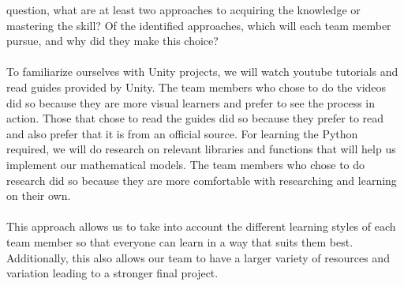 \documentclass[12pt]{article}
\begin{document}
\begin{enumerate}
  question, what are at least two approaches to acquiring the knowledge or
  mastering the skill?  Of the identified approaches, which will each team
  member pursue, and why did they make this choice?
  \\\\
  To familiarize ourselves with Unity projects, we will watch youtube tutorials and read guides provided by Unity.
  The team members who chose to do the videos did so because they are more visual learners and prefer to see the process in action.
  Those that chose to read the guides did so because they prefer to read and also prefer that it is from an official source.
  For learning the Python required, we will do research on relevant libraries and functions that will help us implement our mathematical models.
  The team members who chose to do research did so because they are more comfortable with researching and learning on their own.
  \\\\
  This approach allows us to take into account the different learning styles of each team member so that everyone can learn in a way that suits them best. 
  Additionally, this also allows our team to have a larger variety of resources and variation leading to a stronger final project.

\end{enumerate}
\end{document}
